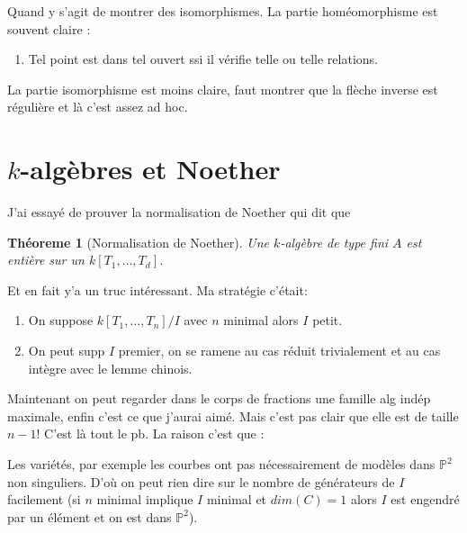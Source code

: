 \documentclass[a4paper,12pt]{book}
\renewcommand{\P}{\mathbb{P}}
\theoremstyle{plain}
\newtheorem{thm}[subsection]{Théoreme}
\theoremstyle{definition}
\theoremstyle{remark}
\begin{document}
Quand y s'agit de montrer des isomorphismes. La partie 
homéomorphisme est souvent claire :
\begin{enumerate}
    \item Tel point est dans tel ouvert ssi il vérifie telle ou telle
	relations.
\end{enumerate}
La partie isomorphisme est moins claire, faut montrer que la flèche
inverse est régulière et là c'est assez ad hoc.


\section{$k$-algèbres et Noether}
J'ai essayé de prouver la normalisation de Noether qui dit que
\begin{thm}[Normalisation de Noether]
    Une $k$-algèbre de type fini $A$ est entière sur un $k[T_1,\ldots,
    T_d]$.
\end{thm}
Et en fait y'a un
truc intéressant. Ma stratégie c'était:
\begin{enumerate}
    \item On suppose $k[T_1,\ldots,T_n]/I$
avec $n$ minimal alors $I$ petit.
    \item On peut supp $I$ premier, on se ramene au cas réduit 
	trivialement et au cas intègre avec le lemme chinois.
\end{enumerate}
Maintenant on peut regarder dans le corps de fractions une famille
alg indép maximale, enfin c'est ce que j'aurai aimé. Mais c'est pas 
clair que elle est de taille $n-1$! C'est là tout le pb. La raison 
c'est que :
\begin{center}
    Les variétés, par exemple les courbes ont pas nécessairement de
    modèles dans $\P^2$ non singuliers. D'où on peut rien dire sur 
    le nombre de générateurs de $I$ facilement (si $n$ minimal implique
    $I$ minimal et $dim(C)=1$ alors $I$ est engendré par un élément 
    et on est dans $\P^2$).
\end{center}
\end{document}

